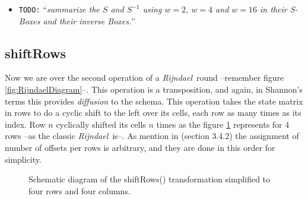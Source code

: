 \documentclass[10pt,a4paper,twoside]{llncs}
\newcommand{\todo}[1]{\texttt{\color{red}TODO:} ``\emph{#1}''}
\newcommand{\fixme}[1]{\texttt{\color{red}FIXME:} ``\emph{#1}''}
\newcommand{\rijndael}{\emph{Rijndael}}
\newcommand{\Fpn}[2]{\ensuremath{\mathbb{F}_{#1^#2}}}
\newcommand{\Fpnm}[2]{\ensuremath{\frac{\Fpn{2}{#1}[#2]}{m(#2)}}}
\begin{document}
\begin{itemize}
\begin{itemize}
\begin{itemize}
   \item \todo{Rule to chose the others, specially odds wordsizes but also bigger than $8$}.
  \end{itemize}
  \item build $g(z)$ in \Fpnm{w}{z}
  \item build $f(z)$ and $f^{-1}(z)$ in \Fpnm{w}{z}
  \begin{itemize}
   \item How to chose the circulant matrix from $b$ of equation \ref{eq:subBytes:affine} used in equation \ref{eq:subBytes:matrix} and the $c$ (and also for the inverse)?
  \end{itemize}
 \end{itemize}
 \item \todo{summarize the $S$ and $S^{-1}$ using $w=2$, $w=4$ and $w=16$ in their \emph{S-Box}es and their inverse Boxes.}
\end{itemize}


\subsection{shiftRows}\label{sec:shiftRows}
Now we are over the second operation of a \rijndael\, round --remember figure \ref{fig:RijndaelDiagram}--. This operation is a transposition, and again, in Shannon's terms this provides \emph{diffusion} to the schema. This operation takes the state matrix in rows to do a cyclic shift to the left over its cells, each row as many times as its index. Row $n$ cyclically shifted its cells $n$ times as the figure \ref{fig:shiftRows} represents for 4 rows --as the classic \rijndael\, is--. As mention in \cite{Daemen:2002:DR:560131} (section 3.4.2) the assignment of number of offsets per rows is arbitrary, and they are done in this order for simplicity.


\begin{figure}[ht]
\begin{center}

\caption{Schematic diagram of the shiftRows() transformation simplified to four rows and four columns.}%
\label{fig:shiftRows}
\end{center}
\end{figure}
\end{document}
